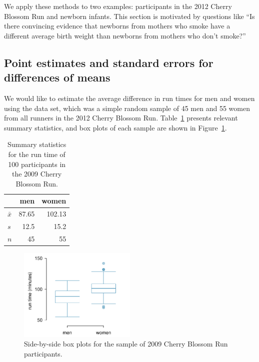 We apply these methods to two examples: participants in the 2012 Cherry Blossom Run and newborn infants. This section is motivated by questions like ``Is there convincing evidence that newborns from mothers who smoke have a different average birth weight than newborns from mothers who don't smoke?''

\subsection{Point estimates and standard errors for differences of means}



We would like to estimate the average difference in run times for men and women using the  data set, which was a simple random sample of 45 men and 55 women from all runners in the 2012 Cherry Blossom Run. Table~\ref{cherryBlossomRun2009SampleOf180SummaryStats} presents relevant summary statistics, and box plots of each sample are shown in Figure~\ref{cbrRunTimesMenWomen}.

\begin{table}[h]
\centering
\begin{tabular}{l rr}
\hline
	&	men	&	women \\
\hline
$\bar{x}$	& 87.65	& 102.13 \\
$s$	&	12.5		& 15.2 \\
$n$	&	45		& 55    \\
\hline
\end{tabular}
\caption{Summary statistics for the run time of 100 participants in the 2009 Cherry Blossom Run.}
\label{cherryBlossomRun2009SampleOf180SummaryStats}
\end{table}

\begin{figure}
\centering
\includegraphics[width=0.5\textwidth]{05/figures/cbrRunTimesMenWomen/cbrRunTimesMenWomen}
\caption{Side-by-side box plots for the sample of 2009 Cherry Blossom Run participants.}
\label{cbrRunTimesMenWomen}
\end{figure}

